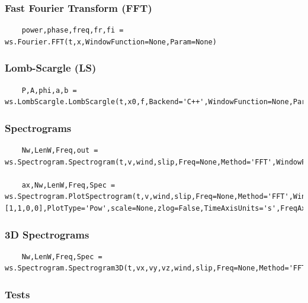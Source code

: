 	\subsubsection{Fast Fourier Transform (FFT)}
	
	\begin{verbatim}
	power,phase,freq,fr,fi = ws.Fourier.FFT(t,x,WindowFunction=None,Param=None)
	\end{verbatim}
	
	\subsubsection{Lomb-Scargle (LS)}
	
	\begin{verbatim}
	P,A,phi,a,b = ws.LombScargle.LombScargle(t,x0,f,Backend='C++',WindowFunction=None,Param=None)
	\end{verbatim}
	
	\subsubsection{Spectrograms}
	
	\begin{verbatim}
	Nw,LenW,Freq,out = ws.Spectrogram.Spectrogram(t,v,wind,slip,Freq=None,Method='FFT',WindowFunction=None,Param=None,Detrend=True,FindGaps=True,GoodData=None,Quiet=True,LenW=None)
	
	ax,Nw,LenW,Freq,Spec = ws.Spectrogram.PlotSpectrogram(t,v,wind,slip,Freq=None,Method='FFT',WindowFunction=None,Param=None,Detrend=True,FindGaps=True,GoodData=None,Quiet=True,LenW=None,fig=None,maps=[1,1,0,0],PlotType='Pow',scale=None,zlog=False,TimeAxisUnits='s',FreqAxisUnits='Hz')
	\end{verbatim}
	
	\subsubsection{3D Spectrograms}
	
	\begin{verbatim}
	Nw,LenW,Freq,Spec = ws.Spectrogram.Spectrogram3D(t,vx,vy,vz,wind,slip,Freq=None,Method='FFT',WindowFunction=None,Param=None,Detrend=True,FindGaps=False,GoodData=None)
	\end{verbatim}
	
	\subsubsection{Tests}
	
